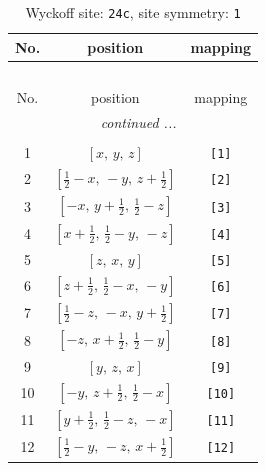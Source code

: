 \documentclass[fleqn,8pt]{jsarticle}
\begin{document}
\begin{longtable}{ccc}
\caption{Wyckoff site: {\tt 24c}, site symmetry: {\tt 1}}
 \\
 \hline \hline
No. & position & mapping \\ \hline \endfirsthead

\multicolumn{2}{l}{\tablename\ \thetable{}} \\
 \hline \hline
No. & position & mapping \\ \hline \endhead

 \hline \hline
\multicolumn{2}{r}{\footnotesize\it continued ...} \\ \endfoot

 \hline \hline
\multicolumn{2}{r}{} \\ \endlastfoot

1 & $\left[ x,\, y,\, z \right]$ & {\tt [1]} \\ \hline
2 & $\left[ \frac{1}{2} - x,\, - y,\, z + \frac{1}{2} \right]$ & {\tt [2]} \\ \hline
3 & $\left[ - x,\, y + \frac{1}{2},\, \frac{1}{2} - z \right]$ & {\tt [3]} \\ \hline
4 & $\left[ x + \frac{1}{2},\, \frac{1}{2} - y,\, - z \right]$ & {\tt [4]} \\ \hline
5 & $\left[ z,\, x,\, y \right]$ & {\tt [5]} \\ \hline
6 & $\left[ z + \frac{1}{2},\, \frac{1}{2} - x,\, - y \right]$ & {\tt [6]} \\ \hline
7 & $\left[ \frac{1}{2} - z,\, - x,\, y + \frac{1}{2} \right]$ & {\tt [7]} \\ \hline
8 & $\left[ - z,\, x + \frac{1}{2},\, \frac{1}{2} - y \right]$ & {\tt [8]} \\ \hline
9 & $\left[ y,\, z,\, x \right]$ & {\tt [9]} \\ \hline
10 & $\left[ - y,\, z + \frac{1}{2},\, \frac{1}{2} - x \right]$ & {\tt [10]} \\ \hline
11 & $\left[ y + \frac{1}{2},\, \frac{1}{2} - z,\, - x \right]$ & {\tt [11]} \\ \hline
12 & $\left[ \frac{1}{2} - y,\, - z,\, x + \frac{1}{2} \right]$ & {\tt [12]} \\
\end{longtable}
\end{document}
